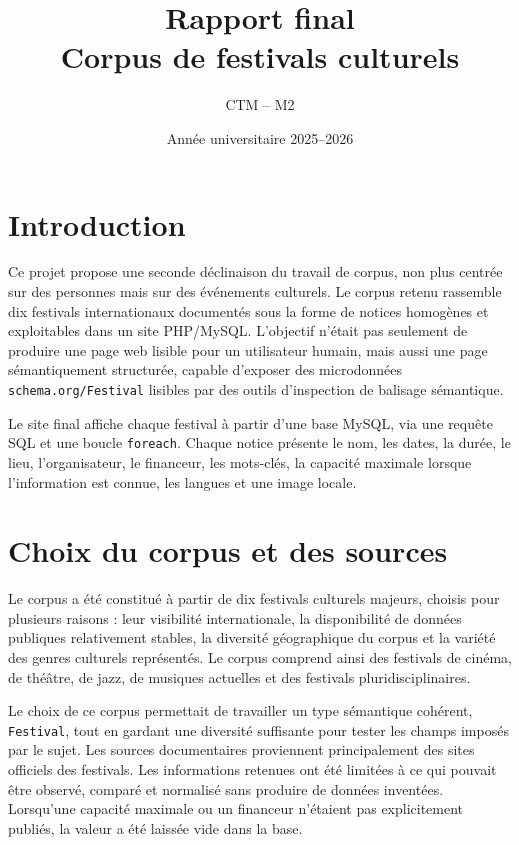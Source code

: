\documentclass[11pt,a4paper]{article}
\title{Rapport final\\Corpus de festivals culturels}
\author{CTM -- M2}
\date{Année universitaire 2025--2026}
\begin{document}
\maketitle

\section*{Introduction}

Ce projet propose une seconde déclinaison du travail de corpus, non plus centrée sur des personnes mais sur des événements culturels. Le corpus retenu rassemble dix festivals internationaux documentés sous la forme de notices homogènes et exploitables dans un site PHP/MySQL. L'objectif n'était pas seulement de produire une page web lisible pour un utilisateur humain, mais aussi une page sémantiquement structurée, capable d'exposer des microdonnées \texttt{schema.org/Festival} lisibles par des outils d'inspection de balisage sémantique.

Le site final affiche chaque festival à partir d'une base MySQL, via une requête SQL et une boucle \texttt{foreach}. Chaque notice présente le nom, les dates, la durée, le lieu, l'organisateur, le financeur, les mots-clés, la capacité maximale lorsque l'information est connue, les langues et une image locale.

\section{Choix du corpus et des sources}

Le corpus a été constitué à partir de dix festivals culturels majeurs, choisis pour plusieurs raisons : leur visibilité internationale, la disponibilité de données publiques relativement stables, la diversité géographique du corpus et la variété des genres culturels représentés. Le corpus comprend ainsi des festivals de cinéma, de théâtre, de jazz, de musiques actuelles et des festivals pluridisciplinaires.

Le choix de ce corpus permettait de travailler un type sémantique cohérent, \texttt{Festival}, tout en gardant une diversité suffisante pour tester les champs imposés par le sujet. Les sources documentaires proviennent principalement des sites officiels des festivals. Les informations retenues ont été limitées à ce qui pouvait être observé, comparé et normalisé sans produire de données inventées. Lorsqu'une capacité maximale ou un financeur n'étaient pas explicitement publiés, la valeur a été laissée vide dans la base.
\end{document}
